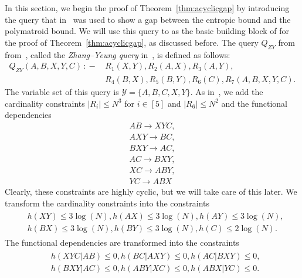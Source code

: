 \documentclass[a4paper,cleveref]{lipics-v2021}
\newcommand{\vset}[1]{\mathcal{#1}}
\newcommand{\datarule}{{\,:\!\!-\,}}
\begin{document}
In this section, we begin the proof of Theorem~\ref{thm:acyclicgap} by introducing the query that in~\cite{Khamis0S17,Suciu23} was used to show a gap between the entropic bound and the polymatroid bound. We will use this query to as the basic building block of for the proof of Theorem~\ref{thm:acyclicgap}, as discussed before.
The query $Q_{ZY}$ from from~\cite{Khamis0S17, Suciu23}, called the \emph{Zhang--Yeung query} in~\cite{Khamis0S17}, is defined as follows:
\begin{equation}
\begin{aligned}
	Q_{ZY}(A,B,X,Y,C) \datarule &R_1(X,Y),  R_2(A,X),  R_3(A,Y),\\ &R_4(B,X), R_5(B,Y),  R_6(C), R_7(A,B,X,Y,C).\label{eq:basequery}
\end{aligned}
\end{equation}
The variable set of this query is $\vset Y = \{A,B,C,X,Y\}$.
As in~\cite{Khamis0S17,Suciu23}, we add the cardinality constraints $|R_i|\le N^3$ for $i\in [5]$ and $|R_6|\le N^2$ and the functional dependencies 
\begin{align}
	AB \rightarrow XYC,\\
	AXY \rightarrow BC,\\
	\label{a1} BXY \rightarrow AC,\\
	AC \rightarrow BXY,\\
	\label{a2} XC \rightarrow ABY,\\
	\label{a3} YC \rightarrow ABX
\end{align}
Clearly, these constraints are highly cyclic, but we will take care of this later. 
We transform the cardinality constraints into the constraints
\begin{align}
	\begin{split}
	&h(XY)\le 3\log(N),
	h(AX)\le 3\log(N),
	h(AY)\le 3\log(N),\\
	&h(BX)\le 3\log(N),
	h(BY)\le 3\log(N),
	h(C)\le 2\log(N).
	\end{split}\label{eq:cczy}
\end{align}
The functional dependencies are transformed into the constraints
\begin{align}
	\begin{split}
	&h(XYC|AB)\le 0,
	h(BC|AXY)\le 0,
	h(AC|BXY)\le 0,\\
	&h(BXY|AC)\le 0, 
	h(ABY|XC)\le 0, 
	h(ABX|YC)\le 0.
	\end{split}\label{eq:fdzy}
\end{align}
\end{document}
